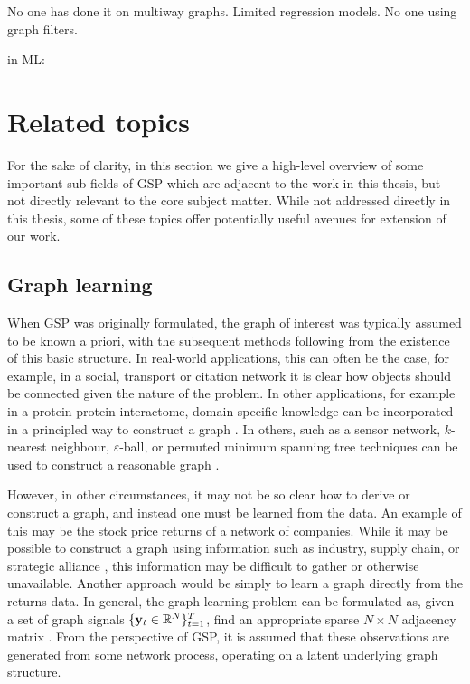 \citep{Ahmed2017}

No one has done it on multiway graphs. Limited regression models. No one using graph filters. 

in ML: \citep{Belkin2002}




\section{Related topics}

For the sake of clarity, in this section we give a high-level overview of some important sub-fields of GSP which are adjacent to the work in this thesis, but not directly relevant to the core subject matter. While not addressed directly in this thesis, some of these topics offer potentially useful avenues for extension of our work. 


\subsection{Graph learning}

When GSP was originally formulated, the graph of interest was typically assumed to be known a priori, with the subsequent methods following from the existence of this basic structure. In real-world applications, this can often be the case, for example, in a social, transport or citation network it is clear how objects should be connected given the nature of the problem. In other applications, for example in a protein-protein interactome, domain specific knowledge can be incorporated in a principled way to construct a graph \citep{Li2023}. In others, such as a sensor network, $k$-nearest neighbour, $\varepsilon$-ball, or permuted minimum spanning tree techniques can be used to construct a reasonable graph \citep{Qiao2018}. 

However, in other circumstances, it may not be so clear how to derive or construct a graph, and instead one must be learned from the data. An example of this may be the stock price returns of a network of companies. While it may be possible to construct a graph using information such as industry, supply chain, or strategic alliance \citep{Gao2021,Cheng2021}, this information may be difficult to gather or otherwise unavailable. Another approach would be simply to learn a graph directly from the returns data. In general, the graph learning problem can be formulated as, given a set of graph signals $\{\mathbf{y}_t \in \mathbb{R}^N\}_{t=1}^T$, find an appropriate sparse $N \times N$ adjacency matrix \citep{Dong2019}. From the perspective of GSP, it is assumed that these observations are generated from some network process, operating on a latent underlying graph structure. 

